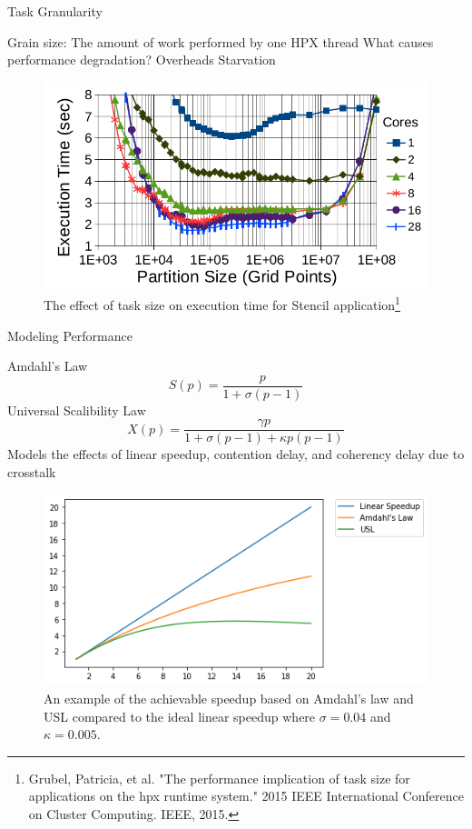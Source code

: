 \documentclass[10pt]{beamer}
\begin{document}
\begin{frame}{Task Granularity}
	\begin{outline}
		Grain size: The amount of work performed by one HPX thread
		\1What causes performance degradation?
		\2Overheads
		\2Starvation
		\begin{figure}
			\centering
			\includegraphics[width=0.72\linewidth]{images/task_granularity.png}
			\caption{The effect of task size on execution time for Stencil application\footnote{Grubel, Patricia, et al. "The performance implication of task size for applications on the hpx runtime system." 2015 IEEE International Conference on Cluster Computing. IEEE, 2015.}}	
	
		\end{figure}
		
	\end{outline}
\end{frame}


\begin{frame}{Modeling Performance}
	\begin{outline}
		\1Amdahl's Law
			$$S(p) = \frac{p}{1+\sigma(p-1)}$$
		\1Universal Scalibility Law
		$$X(p) = \frac{\gamma{p}}{1+\sigma(p-1)+\kappa{p}(p-1)}$$
		\2 Models the effects
		of linear speedup, contention delay, and coherency delay due to crosstalk
		\begin{figure}[H]
			\centering
			\includegraphics[scale=0.4]{images/amdahls.png}
			\caption{An example of the achievable speedup based on Amdahl's law and USL compared to the ideal linear speedup where $\sigma=0.04$ and $\kappa=0.005$.}	
			\label{fig_Amdahl}
		\end{figure}
		

	\end{outline}
\end{frame}
\end{document}
